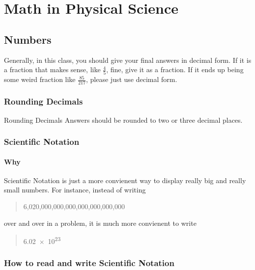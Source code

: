 \documentclass[../../main.tex]{subfiles}
\begin{document}

\chapter{Math in Physical Science}

\section{Numbers}

Generally, in this class, you should give your final answers in decimal form.  If it is a fraction that makes sense, like \(\frac{4}{5}\), fine, give it as a fraction.  If it ends up being some weird fraction like \(\frac{85}{217}\), please just use decimal form.\\

\subsection{Rounding Decimals}

\begin{boxPink}{Rounding Decimals}
	Answers should be rounded to two or three decimal places.
\end{boxPink}


\subsection{Scientific Notation}

\subsubsection{Why}

Scientific Notation is just a more convienent way to display really big and really small numbers.  For instance, instead of writing

\begin{quote}
	{\huge 6,020,000,000,000,000,000,000,000}
\end{quote}

over and over in a problem, it is much more convienent to write

\begin{quote}
	{\huge \num{6.02e23}}
\end{quote}

\newpage
\subsection{How to read and write Scientific Notation}
\end{document}
